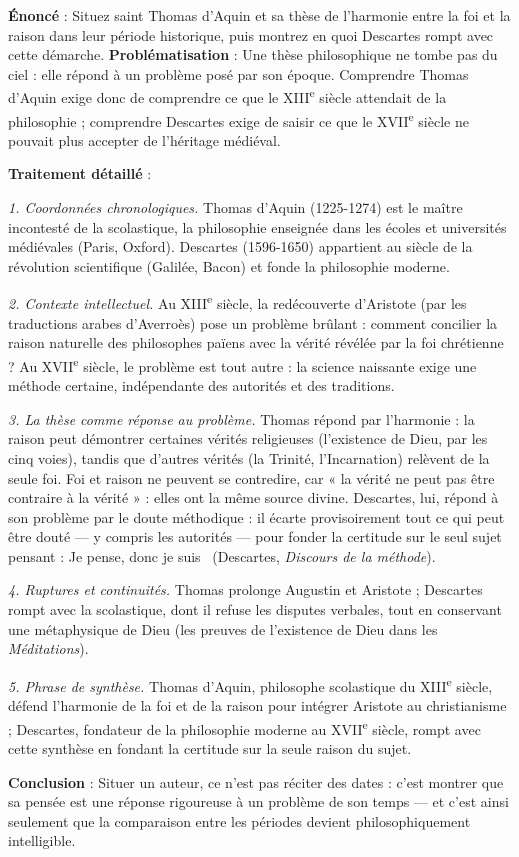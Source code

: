 \documentclass[11pt]{article}
\newcommand{\cle}[1]{{\popxbold\color{popdark}#1}}
\begin{document}
\begin{exoresolu}
\textbf{Énoncé} : Situez saint Thomas d'Aquin et sa thèse de l'harmonie entre la foi et la raison dans leur période historique, puis montrez en quoi Descartes rompt avec cette démarche.
\tcblower
\textbf{Problématisation} : Une thèse philosophique ne tombe pas du ciel : elle répond à un problème posé par son époque. Comprendre Thomas d'Aquin exige donc de comprendre ce que le XIII\textsuperscript{e} siècle attendait de la philosophie ; comprendre Descartes exige de saisir ce que le XVII\textsuperscript{e} siècle ne pouvait plus accepter de l'héritage médiéval.

\textbf{Traitement détaillé} :

\emph{1. Coordonnées chronologiques.} Thomas d'Aquin (1225-1274) est le maître incontesté de la \cle{scolastique}, la philosophie enseignée dans les écoles et universités médiévales (Paris, Oxford). Descartes (1596-1650) appartient au siècle de la révolution scientifique (Galilée, Bacon) et fonde la philosophie \cle{moderne}.

\emph{2. Contexte intellectuel.} Au XIII\textsuperscript{e} siècle, la redécouverte d'Aristote (par les traductions arabes d'Averroès) pose un problème brûlant : comment concilier la raison naturelle des philosophes païens avec la vérité révélée par la foi chrétienne ? Au XVII\textsuperscript{e} siècle, le problème est tout autre : la science naissante exige une méthode certaine, indépendante des autorités et des traditions.

\emph{3. La thèse comme réponse au problème.} Thomas répond par l'\cle{harmonie} : la raison peut démontrer certaines vérités religieuses (l'existence de Dieu, par les cinq voies), tandis que d'autres vérités (la Trinité, l'Incarnation) relèvent de la seule foi. Foi et raison ne peuvent se contredire, car « la vérité ne peut pas être contraire à la vérité » : elles ont la même source divine. Descartes, lui, répond à son problème par le \cle{doute méthodique} : il écarte provisoirement tout ce qui peut être douté — y compris les autorités — pour fonder la certitude sur le seul sujet pensant : \guillemotleft Je pense, donc je suis \guillemotright\ (Descartes, \emph{Discours de la méthode}).

\emph{4. Ruptures et continuités.} Thomas prolonge Augustin et Aristote ; Descartes rompt avec la scolastique, dont il refuse les disputes verbales, tout en conservant une métaphysique de Dieu (les preuves de l'existence de Dieu dans les \emph{Méditations}).

\emph{5. Phrase de synthèse.} Thomas d'Aquin, philosophe scolastique du XIII\textsuperscript{e} siècle, défend l'harmonie de la foi et de la raison pour intégrer Aristote au christianisme ; Descartes, fondateur de la philosophie moderne au XVII\textsuperscript{e} siècle, rompt avec cette synthèse en fondant la certitude sur la seule raison du sujet.

\textbf{Conclusion} : Situer un auteur, ce n'est pas réciter des dates : c'est montrer que sa pensée est une réponse rigoureuse à un problème de son temps — et c'est ainsi seulement que la comparaison entre les périodes devient philosophiquement intelligible.
\end{exoresolu}
\end{document}
